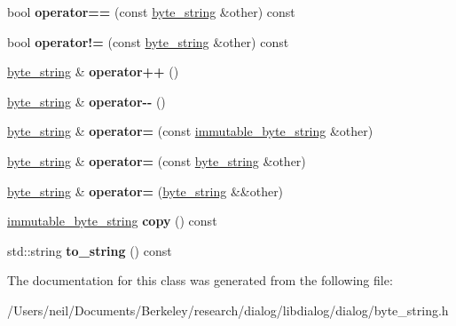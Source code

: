 \begin{DoxyCompactItemize}
bool {\bfseries operator==} (const \hyperlink{classdialog_1_1byte__string}{byte\+\_\+string} \&other) const
\item 
\mbox{\label{classdialog_1_1byte__string_ae4f19c0edb37d4344314cdee9777e09a}} 
bool {\bfseries operator!=} (const \hyperlink{classdialog_1_1byte__string}{byte\+\_\+string} \&other) const
\item 
\mbox{\label{classdialog_1_1byte__string_a2e064d4077c1b37e65f45e7b0f7696d3}} 
\hyperlink{classdialog_1_1byte__string}{byte\+\_\+string} \& {\bfseries operator++} ()
\item 
\mbox{\label{classdialog_1_1byte__string_a08e49ec43a7c1e23dd33756e3b246c8f}} 
\hyperlink{classdialog_1_1byte__string}{byte\+\_\+string} \& {\bfseries operator-\/-\/} ()
\item 
\mbox{\label{classdialog_1_1byte__string_ae00f6c37b2241c9fe633032caeb426c2}} 
\hyperlink{classdialog_1_1byte__string}{byte\+\_\+string} \& {\bfseries operator=} (const \hyperlink{classdialog_1_1immutable__byte__string}{immutable\+\_\+byte\+\_\+string} \&other)
\item 
\mbox{\label{classdialog_1_1byte__string_a9bbea0c4b365a9e4526bb5330f825bb4}} 
\hyperlink{classdialog_1_1byte__string}{byte\+\_\+string} \& {\bfseries operator=} (const \hyperlink{classdialog_1_1byte__string}{byte\+\_\+string} \&other)
\item 
\mbox{\label{classdialog_1_1byte__string_a8a8e4175f33663cff1c80697eda7a617}} 
\hyperlink{classdialog_1_1byte__string}{byte\+\_\+string} \& {\bfseries operator=} (\hyperlink{classdialog_1_1byte__string}{byte\+\_\+string} \&\&other)
\item 
\mbox{\label{classdialog_1_1byte__string_a361caf4069c967a2ebc5370dcacb6743}} 
\hyperlink{classdialog_1_1immutable__byte__string}{immutable\+\_\+byte\+\_\+string} {\bfseries copy} () const
\item 
\mbox{\label{classdialog_1_1byte__string_aa538423485c8665531412f997ff821ce}} 
std\+::string {\bfseries to\+\_\+string} () const
\end{DoxyCompactItemize}


The documentation for this class was generated from the following file\+:\begin{DoxyCompactItemize}
\item 
/\+Users/neil/\+Documents/\+Berkeley/research/dialog/libdialog/dialog/byte\+\_\+string.\+h\end{DoxyCompactItemize}
